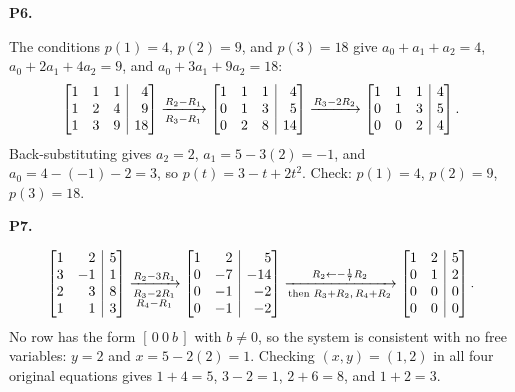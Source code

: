 \documentclass[10pt]{scrartcl}
\makeatletter
\newcommand{\aug}[2]{\left[\begin{array}{@{}#1@{}}#2\end{array}\right]}
\makeatother
\begin{document}
\begin{prob}\textbf{P6.}\par{}
The conditions $p(1)=4$, $p(2)=9$, and $p(3)=18$ give $a_0+a_1+a_2=4$, $a_0+2a_1+4a_2=9$, and $a_0+3a_1+9a_2=18$:
\[
  \aug{rrr|r}{1&1&1&4\\1&2&4&9\\1&3&9&18}\xrightarrow[R_3-R_1]{R_2-R_1}\aug{rrr|r}{1&1&1&4\\0&1&3&5\\0&2&8&14}\xrightarrow{R_3-2R_2}\aug{rrr|r}{1&1&1&4\\0&1&3&5\\0&0&2&4}.
\]
Back-substituting gives $a_2=2$, $a_1=5-3(2)=-1$, and $a_0=4-(-1)-2=3$, so $p(t)=3-t+2t^2$. Check: $p(1)=4$, $p(2)=9$, $p(3)=18$.
\end{prob}

\begin{prob}\textbf{P7.}\par{}
\[
  \aug{rr|r}{1&2&5\\3&-1&1\\2&3&8\\1&1&3}\xrightarrow[\substack{R_3-2R_1\\R_4-R_1}]{R_2-3R_1}\aug{rr|r}{1&2&5\\0&-7&-14\\0&-1&-2\\0&-1&-2}\xrightarrow[\text{then }R_3+R_2,\,R_4+R_2]{R_2\leftarrow -\frac{1}{7}R_2}\aug{rr|r}{1&2&5\\0&1&2\\0&0&0\\0&0&0}.
\]
No row has the form $[\,0\ 0\ b\,]$ with $b\ne0$, so the system is consistent with no free variables: $y=2$ and $x=5-2(2)=1$. Checking $(x,y)=(1,2)$ in all four original equations gives $1+4=5$, $3-2=1$, $2+6=8$, and $1+2=3$.
\end{prob}
\end{document}
